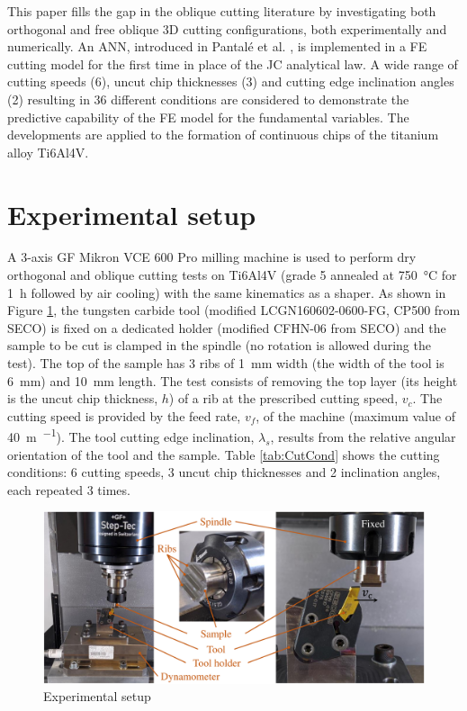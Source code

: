 \documentclass[preprint,12pt,times]{elsarticle}
\begin{document}
This paper fills the gap in the oblique cutting literature by investigating both orthogonal and free oblique 3D cutting configurations, both experimentally and numerically. An ANN, introduced in Pantalé et al. \cite{pantale_Efficient_2022}, is implemented in a FE cutting model for the first time in place of the JC analytical law. A wide range of cutting speeds (6), uncut chip thicknesses (3) and cutting edge inclination angles (2) resulting in 36 different conditions are considered to demonstrate the predictive capability of the FE model for the fundamental variables. The developments are applied to the formation of continuous chips of the titanium alloy Ti6Al4V.

\section{Experimental setup}
\label{ExpSet}

A 3-axis GF Mikron VCE 600 Pro milling machine is used to perform dry orthogonal and oblique cutting tests on Ti6Al4V (grade 5 annealed at \qty{750}{\degreeCelsius} for \qty{1}{\hour} followed by air cooling) with the same kinematics as a shaper. As shown in Figure \ref{fig:ExpSetup}, the tungsten carbide tool (modified LCGN160602-0600-FG, CP500 from SECO) is fixed on a dedicated holder (modified CFHN-06 from SECO) and the sample to be cut is clamped in the spindle (no rotation is allowed during the test). The top of the sample has 3 ribs of \qty{1}{\mm} width (the width of the tool is \qty{6}{\mm}) and \qty{10}{\mm} length. The test consists of removing the top layer (its height is the uncut chip thickness, $h$) of a rib at the prescribed cutting speed, $v_c$. The cutting speed is provided by the feed rate, $v_f$, of the machine (maximum value of \qty{40}{\metre\per\min}). The tool cutting edge inclination, $\lambda_s$, results from the relative angular orientation of the tool and the sample. Table \ref{tab:CutCond} shows the cutting conditions: 6 cutting speeds, 3 uncut chip thicknesses and 2 inclination angles, each repeated 3 times.

\begin{figure}[!h]
\centering
\includegraphics[width = 140 mm]{Figures/ExpSetup} %
\caption{Experimental setup}
\label{fig:ExpSetup}
\end{figure}
\end{document}
